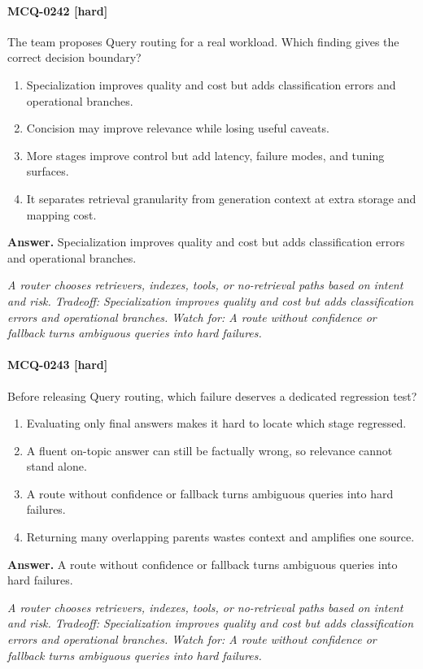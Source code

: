 \paragraph{MCQ-0242 [hard]} The team proposes Query routing for a real workload. Which finding gives the correct decision boundary?
\begin{enumerate}[label=\Alph*.]
\item Specialization improves quality and cost but adds classification errors and operational branches.
\item Concision may improve relevance while losing useful caveats.
\item More stages improve control but add latency, failure modes, and tuning surfaces.
\item It separates retrieval granularity from generation context at extra storage and mapping cost.
\end{enumerate}
\noindent\textbf{Answer.} Specialization improves quality and cost but adds classification errors and operational branches.
\par\textit{A router chooses retrievers, indexes, tools, or no-retrieval paths based on intent and risk. Tradeoff: Specialization improves quality and cost but adds classification errors and operational branches. Watch for: A route without confidence or fallback turns ambiguous queries into hard failures.}
\paragraph{MCQ-0243 [hard]} Before releasing Query routing, which failure deserves a dedicated regression test?
\begin{enumerate}[label=\Alph*.]
\item Evaluating only final answers makes it hard to locate which stage regressed.
\item A fluent on-topic answer can still be factually wrong, so relevance cannot stand alone.
\item A route without confidence or fallback turns ambiguous queries into hard failures.
\item Returning many overlapping parents wastes context and amplifies one source.
\end{enumerate}
\noindent\textbf{Answer.} A route without confidence or fallback turns ambiguous queries into hard failures.
\par\textit{A router chooses retrievers, indexes, tools, or no-retrieval paths based on intent and risk. Tradeoff: Specialization improves quality and cost but adds classification errors and operational branches. Watch for: A route without confidence or fallback turns ambiguous queries into hard failures.}
